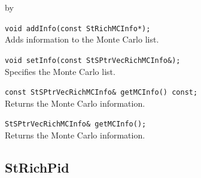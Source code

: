 \documentclass[twoside]{article}
\newcommand{\entrylabel}[1]{\mbox{\textbf{{#1}}}\hfil}%
\newenvironment{entry}
{\begin{list}{}%
    {\renewcommand{\makelabel}{\entrylabel}%
     \setlength{\labelwidth}{90pt}%
     \setlength{\leftmargin}{\labelwidth}
     \advance\leftmargin by \labelsep%
      }%
    }%
  {\end{list}}
\newcommand{\Entrylabel}[1]%
{\raisebox{0pt}[1ex][0pt]{\makebox[\labelwidth][l]%
    {\parbox[t]{\labelwidth}{\hspace{0pt}\textbf{{#1}}}}}}
\newenvironment{Entry}%
{\renewcommand{\entrylabel}{\Entrylabel}\begin{entry}}%
  {\end{entry}}
\begin{document}
\begin{Entry}
    \verb+void addInfo(const StRichMCInfo*);+\\
    Adds information to the Monte Carlo list.

    \verb+void setInfo(const StSPtrVecRichMCInfo&);+\\
    Specifies the Monte Carlo list.

    \verb+const StSPtrVecRichMCInfo& getMCInfo() const;+\\
    Returns the Monte Carlo information.

    \verb+StSPtrVecRichMCInfo& getMCInfo();+\\
    Returns the Monte Carlo information.
\end{Entry}
\clearpage

\subsection{StRichPid}
\label{sec:StRichPid}
\end{document}
